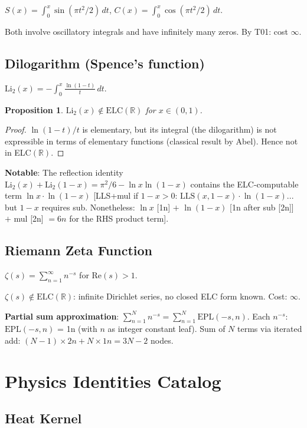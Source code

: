 \documentclass[11pt]{article}
\newtheorem{proposition}[theorem]{Proposition}
\begin{document}
$S(x)=\int_0^x\sin(\pi t^2/2)\,dt$, $C(x)=\int_0^x\cos(\pi t^2/2)\,dt$.

Both involve oscillatory integrals and have infinitely many zeros.
By T01: cost $\infty$.

\subsection{Dilogarithm (Spence's function)}

$\mathrm{Li}_2(x)=-\int_0^x\frac{\ln(1-t)}{t}\,dt$.

\begin{proposition}
$\mathrm{Li}_2(x)\notin\mathrm{ELC}(\mathbb{R})$ for $x\in(0,1)$.
\end{proposition}

\begin{proof}
$\ln(1-t)/t$ is elementary, but its integral (the dilogarithm) is not expressible in
terms of elementary functions (classical result by Abel). Hence not in ELC$(\mathbb{R})$.
\end{proof}

\textbf{Notable}: The reflection identity $\mathrm{Li}_2(x)+\mathrm{Li}_2(1-x)=\pi^2/6-\ln x\ln(1-x)$
contains the ELC-computable term $\ln x\cdot\ln(1-x)$ [LLS+mul if $1-x>0$:
$\mathrm{LLS}(x,1-x)\cdot\ln(1-x)$... but $1-x$ requires sub. Nonetheless:
$\ln x$ [1n] $+$ $\ln(1-x)$ [1n after sub [2n]] $+$ mul [2n] $= 6n$ for the RHS product term].

\subsection{Riemann Zeta Function}

$\zeta(s)=\sum_{n=1}^\infty n^{-s}$ for $\text{Re}(s)>1$.

$\zeta(s)\notin\mathrm{ELC}(\mathbb{R})$: infinite Dirichlet series, no closed ELC form known.
Cost: $\infty$.

\textbf{Partial sum approximation}:
$\sum_{n=1}^N n^{-s} = \sum_{n=1}^N \mathrm{EPL}(-s, n)$.
Each $n^{-s}$: $\mathrm{EPL}(-s,n)$ = 1n (with $n$ as integer constant leaf). Sum of $N$ terms
via iterated add: $(N-1)\times 2n + N\times 1n = 3N-2$ nodes.

\section{Physics Identities Catalog}

\subsection{Heat Kernel}
\end{document}
